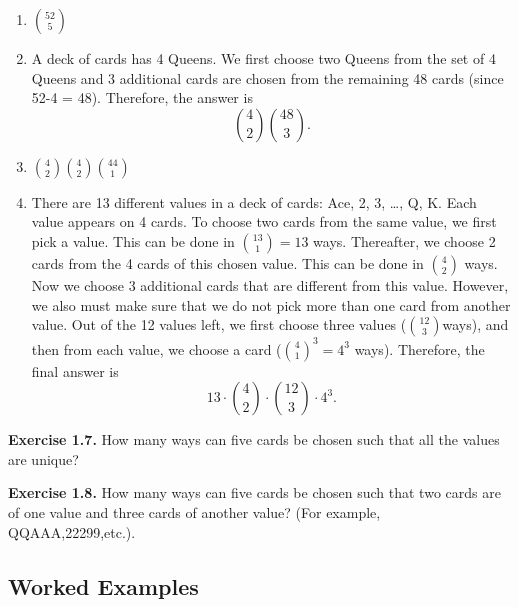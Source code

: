 \documentclass[
  12pt,
]{krantzNoCorner}
\begin{document}
\begin{enumerate}
\def\labelenumi{\arabic{enumi}.}
\item
  \(\binom{52}{5}\)
\item
  A deck of cards has 4 Queens. We first choose two Queens from the
  set of 4 Queens and 3 additional cards are chosen from the remaining
  48 cards (since 52-4 = 48). Therefore, the answer is
  \[\binom{4}{2}\binom{48}{3}.\]
\item
  \(\binom{4}{2}\binom{4}{2}\binom{44}{1}\)
\item
  There are 13 different values in a deck of cards: Ace, 2, 3, \ldots,
  Q, K. Each value appears on 4 cards. To choose two cards from the
  same value, we first pick a value. This can be done in
  \(\binom{13}{1}=13\) ways. Thereafter, we choose 2 cards from the 4
  cards of this chosen value. This can be done in \(\binom{4}{2}\) ways.
  Now we choose 3 additional cards that are different from this value.
  However, we also must make sure that we do not pick more than one
  card from another value. Out of the 12 values left, we first choose
  three values (\(\binom{12}{3}\)ways), and then from each value, we
  choose a card (\(\binom{4}{1}^3=4^3\) ways). Therefore, the final
  answer is \[13\cdot\binom{4}{2}\cdot \binom{12}{3}\cdot 4^3.\]
\end{enumerate}

\textbf{Exercise 1.7.} How many ways can five cards be chosen such that all
the values are unique?

\textbf{Exercise 1.8.} How many ways can five cards be chosen such that two
cards are of one value and three cards of another value? (For example,
QQAAA,22299,etc.).

\hypertarget{worked-examples}{%
\subsection{Worked Examples}\label{worked-examples}}
\end{document}
